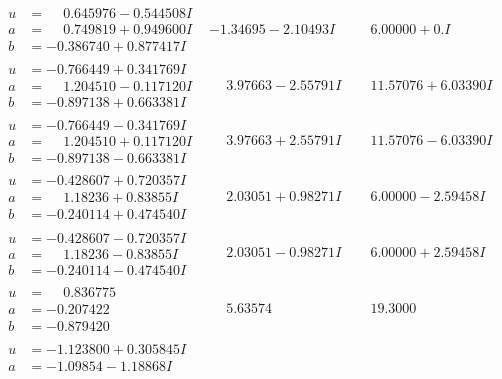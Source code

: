 \documentclass[1p]{elsarticle_modified}
\theoremstyle{definition}
\begin{document}
$$\begin{array}{c|c|c}
\begin{aligned}
u &= \phantom{-}0.645976 - 0.544508 I \\
a &= \phantom{-}0.749819 + 0.949600 I \\
b &= -0.386740 + 0.877417 I\end{aligned}
 & -1.34695 - 2.10493 I & \phantom{-}6.00000 + 0. I\phantom{ +0.000000I} \\ \hline\begin{aligned}
u &= -0.766449 + 0.341769 I \\
a &= \phantom{-}1.204510 - 0.117120 I \\
b &= -0.897138 + 0.663381 I\end{aligned}
 & \phantom{-}3.97663 - 2.55791 I & \phantom{-}11.57076 + 6.03390 I \\ \hline\begin{aligned}
u &= -0.766449 - 0.341769 I \\
a &= \phantom{-}1.204510 + 0.117120 I \\
b &= -0.897138 - 0.663381 I\end{aligned}
 & \phantom{-}3.97663 + 2.55791 I & \phantom{-}11.57076 - 6.03390 I \\ \hline\begin{aligned}
u &= -0.428607 + 0.720357 I \\
a &= \phantom{-}1.18236 + 0.83855 I \\
b &= -0.240114 + 0.474540 I\end{aligned}
 & \phantom{-}2.03051 + 0.98271 I & \phantom{-}6.00000 - 2.59458 I \\ \hline\begin{aligned}
u &= -0.428607 - 0.720357 I \\
a &= \phantom{-}1.18236 - 0.83855 I \\
b &= -0.240114 - 0.474540 I\end{aligned}
 & \phantom{-}2.03051 - 0.98271 I & \phantom{-}6.00000 + 2.59458 I \\ \hline\begin{aligned}
u &= \phantom{-}0.836775\phantom{ +0.000000I} \\
a &= -0.207422\phantom{ +0.000000I} \\
b &= -0.879420\phantom{ +0.000000I}\end{aligned}
 & \phantom{-}5.63574\phantom{ +0.000000I} & \phantom{-}19.3000\phantom{ +0.000000I} \\ \hline\begin{aligned}
u &= -1.123800 + 0.305845 I \\
a &= -1.09854 - 1.18868 I \\

\end{aligned}
\end{array}$$
\end{document}
